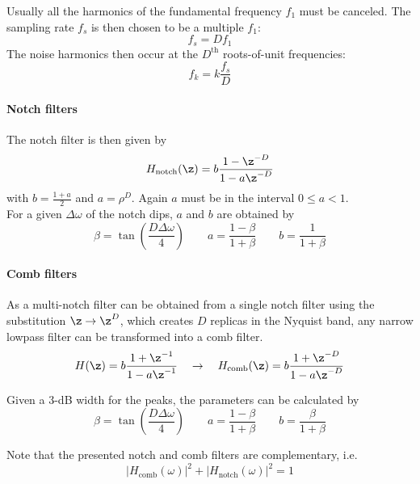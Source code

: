 Usually all the harmonics of the fundamental frequency $f_1$ must be canceled.
The sampling rate $f_s$ is then chosen to be a multiple $f_1$:
\begin{equation*}
	f_s = D f_1
\end{equation*}
The noise harmonics then occur at the $D^{\text{th}}$ roots-of-unit frequencies:
\begin{equation*}
	f_k = k \frac{f_s}{D}
\end{equation*}

\paragraph{Notch filters}The notch filter is then given by
\begin{equation*}
	H_{\text{notch}}(\z) = b \frac{1-\z^{-D}}{1-a\z^{-D}}
\end{equation*}
with $b = \frac{1+a}{2}$ and $a = \rho^D$. Again $a$ must be in the interval
$0 \leq a < 1$. \\

For a given $\Delta\omega$ of the notch dips, $a$ and $b$  are obtained by
\begin{equation*}
	\beta = \tan\left(\frac{D\Delta\omega}{4}\right) \qquad a = \frac{1-\beta}{1+\beta} \qquad b = \frac{1}{1+\beta}
\end{equation*}

\paragraph{Comb filters}
As a multi-notch filter can be obtained from a single notch filter using the
substitution $\z \to \z^D$, which creates $D$ replicas in the Nyquist band,
any narrow lowpass filter can be transformed into a comb filter.
\begin{equation*}
	H(\z) = b \frac{1+\z^{-1}}{1-a\z^{-1}} \quad \to \quad
	H_{\text{comb}}(\z) = b \frac{1+\z^{-D}}{1-a\z^{-D}}
\end{equation*}

Given a 3-dB width for the peaks, the parameters can be calculated by
\begin{equation*}
	\beta = \tan\left(\frac{D\Delta\omega}{4}\right) \qquad
	a = \frac{1-\beta}{1+\beta} \qquad b = \frac{\beta}{1+\beta}
\end{equation*}

Note that the presented notch and comb filters are complementary, i.e.
\begin{equation*}
	\left|H_{\text{comb}}(\omega)\right|^2 + \left|H_{\text{notch}}(\omega)\right|^2 = 1
\end{equation*}

